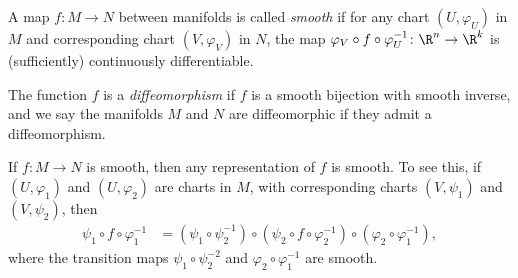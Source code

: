 \documentclass[10pt]{mypackage}
\begin{document}
\begin{definition}
  A map $f\colon M\rightarrow N$ between manifolds is called \textit{smooth} if for any chart $\left( U,\varphi_U \right)$ in $M$ and corresponding chart $\left( V,\varphi_V \right)$ in $N$, the map $\varphi_V\circ f \circ \varphi_U^{-1}\colon \R^n\rightarrow \R^k$ is (sufficiently) continuously differentiable.\newline

  The function $f$ is a \textit{diffeomorphism} if $f$ is a smooth bijection with smooth inverse, and we say the manifolds $M$ and $N$ are diffeomorphic if they admit a diffeomorphism.
\end{definition}
\begin{remark}
  If $f\colon M\rightarrow N$ is smooth, then any representation of $f$ is smooth. To see this, if $\left( U,\varphi_1 \right)$ and $\left( U,\varphi_2 \right)$ are charts in $M$, with corresponding charts $\left( V,\psi_1 \right)$ and $\left( V,\psi_2 \right)$, then
  \begin{align*}
    \psi_{1}\circ f \circ \varphi_1^{-1} &= \left( \psi_1\circ \psi_2^{-1} \right)\circ \left( \psi_2\circ f \circ \varphi_2^{-1} \right)\circ \left( \varphi_2\circ \varphi_1^{-1} \right),
  \end{align*}
  where the transition maps $\psi_1\circ \psi_2^{-2}$ and $\varphi_2\circ \varphi_1^{-1}$ are smooth.
\end{remark}
\end{document}
